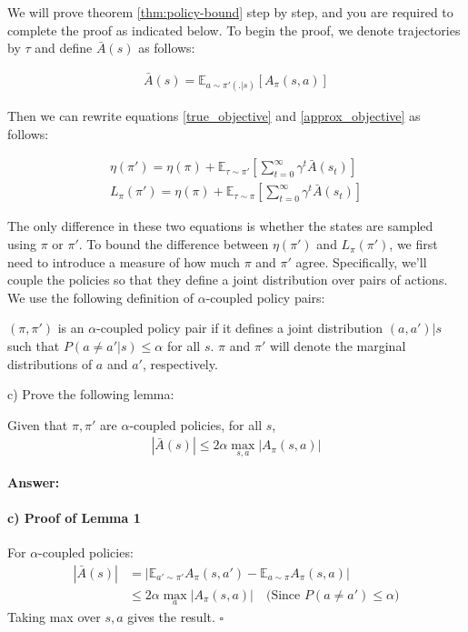 We will prove theorem \ref{thm:policy-bound} step by step, and you are required to complete the proof as indicated below. To begin the proof, we denote trajectories by $\tau$ and define $\bar{A}(s)$ as follows:

\begin{align*}
    \bar{A}(s) = \mathbb{E}_{a \sim \pi'(.|s)}[A_{\pi}(s, a)]
\end{align*}

Then we can rewrite equations \ref{true_objective} and \ref{approx_objective} as follows:

\begin{align}
    \eta(\pi') = \eta(\pi) + \mathbb{E}_{\tau \sim \pi'}[\sum_{t = 0}^{\infty}\gamma^t \bar{A}(s_t)] \\
    L_{\pi}(\pi') = \eta(\pi) + \mathbb{E}_{\tau \sim \pi}[\sum_{t = 0}^{\infty}\gamma^t \bar{A}(s_t)] 
\end{align}

The only difference in these two equations is whether the states are sampled using $\pi$ or $\pi'$. To bound the difference between $\eta(\pi')$ and $L_{\pi}(\pi')$, we first need to introduce a measure of how much $\pi$ and $\pi'$ agree. Specifically, we'll couple the policies so that they define a joint distribution over pairs of actions. We use the following definition of $\alpha$-coupled policy pairs:

\begin{definition}
    $(\pi, \pi')$ is an $\alpha$-coupled policy pair if it defines a joint distribution $(a, a')|s$ such that $P(a \neq a'|s) \le \alpha$ for all $s$. $\pi$ and $\pi'$ will denote the marginal distributions of $a$ and $a'$, respectively.
\end{definition}

c) Prove the following lemma:

\begin{lemma}
    Given that $\pi, \pi'$ are $\alpha$-coupled policies, for all $s$,
    \begin{align*}
        |\bar{A}(s)| \le 2\alpha \max_{s, a}|A_{\pi}(s,a)|
    \end{align*}
\end{lemma}


\textbf{Answer:}

\paragraph{c) Proof of Lemma 1} For $\alpha$-coupled policies:
\begin{align*}
|\bar{A}(s)| &= \left|\mathbb{E}_{a'\sim\pi'} A_\pi(s,a') - \mathbb{E}_{a\sim\pi} A_\pi(s,a)\right| \\
&\leq 2\alpha \max_{a} |A_\pi(s,a)| \quad \text{(Since $P(a\neq a') \leq \alpha$)}
\end{align*}
Taking max over $s,a$ gives the result. $\square$


